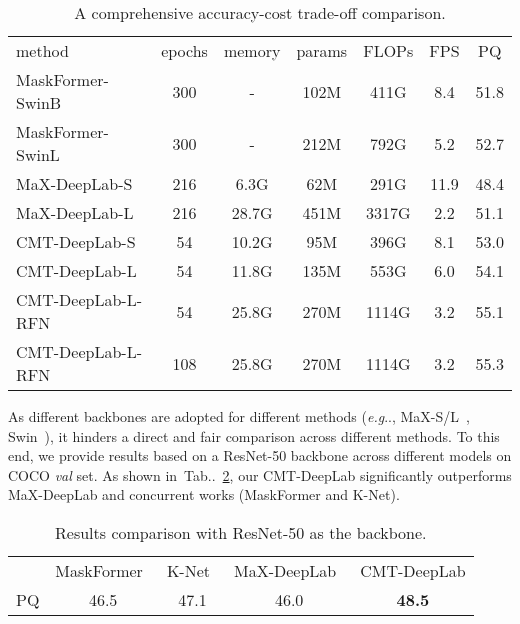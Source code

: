 \documentclass[10pt,twocolumn,letterpaper]{article}
\makeatletter
\DeclareRobustCommand\onedot{\futurelet\@let@token\@onedot}
\def\@onedot{\ifx\@let@token.\else.\null\fi\xspace}
\def\eg{\emph{e.g}\onedot} \def\Eg{\emph{E.g}\onedot}
\newcommand{\tabref}[1]{Tab\onedot~\ref{#1}}
\newcommand{\tablestyle}[2]{\setlength{\tabcolsep}{#1}\renewcommand{\arraystretch}{#2}\centering\footnotesize}
\makeatother
\begin{document}
\begin{table}[t]
\centering
\tablestyle{1.1pt}{1.1}
\begin{tabular}{l|cc|ccc|c}
method                & epochs & memory & params & FLOPs & FPS & PQ            \\ \shline
MaskFormer-SwinB~\cite{cheng2021per} & 300 & - & 102M  & 411G  & 8.4 & 51.8 \\
MaskFormer-SwinL~\cite{cheng2021per}  & 300 & - & 212M  & 792G  & 5.2  & 52.7 \\
\hline
MaX-DeepLab-S~\cite{wang2021max}    & 216   & 6.3G   & 62M  & 291G   & 11.9 & 48.4          \\
MaX-DeepLab-L~\cite{wang2021max}    & 216   & 28.7G  & 451M   & 3317G  & 2.2  & 51.1          \\
\hline
CMT-DeepLab-S    & 54   & 10.2G  & 95M  & 396G & 8.1  & 53.0          \\
CMT-DeepLab-L    & 54   & 11.8G  & 135M & 553G  & 6.0  & 54.1          \\
CMT-DeepLab-L-RFN & 54  & 25.8G  & 270M & 1114G & 3.2    & 55.1          \\
CMT-DeepLab-L-RFN & 108 & 25.8G   & 270M & 1114G & 3.2    & 55.3          \\
\end{tabular}
\caption{A comprehensive accuracy-cost trade-off comparison.
}
\label{tab:flops}
\end{table}

As different backbones are adopted for different methods (\eg, MaX-S/L~\cite{wang2021max}, Swin~\cite{liu2021swin}), it hinders a direct and fair comparison across different methods. To this end, we provide results based on a ResNet-50 backbone across different models on COCO \textit{val} set. As shown in~\tabref{tab:r50}, our CMT-DeepLab significantly outperforms MaX-DeepLab and concurrent works (MaskFormer and K-Net).


\begin{table}[t]
\centering
\tablestyle{2pt}{1}
\begin{tabular}{c|cccc}
 & MaskFormer~\cite{cheng2021per} & K-Net~\cite{zhang2021k} & MaX-DeepLab~\cite{wang2021max} & CMT-DeepLab \\ \shline
PQ     & 46.5       & 47.1  & 46.0           & \textbf{48.5}  \\
\end{tabular}
\caption{Results comparison with ResNet-50 as the backbone.}
\label{tab:r50}
\end{table}
\end{document}
